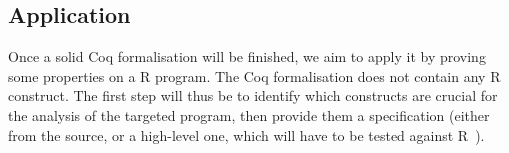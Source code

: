 \documentclass{article}
\newcommand\Coq{Coq}
\newcommand\R{R}
\begin{document}
\subsection{Application}
\label{sec:application}

Once a solid \Coq{} formalisation will be finished,
we aim to apply it by proving some properties on a \R{} program.
%
The \Coq{} formalisation does not contain any \R{} construct.
The first step will thus be to identify which constructs
are crucial for the analysis of the targeted program,
then provide them a specification
(either from the source, or a high-level one, which will have
to be tested against \R{}~\parencite{maj2013testr}).


\printbibliography
\end{document}
